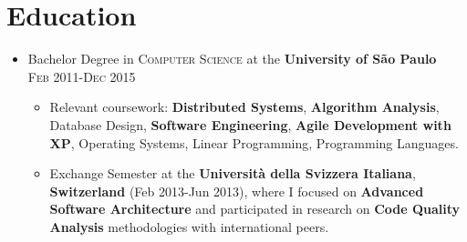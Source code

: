 
\section{Education}
\begin{itemize}
    \item \footnotesize{Bachelor Degree in \textsc{Computer Science} at the \textbf{University of São Paulo}}\\
    \textsc{\scriptsize{Feb 2011-Dec 2015}}
    \begin{itemize}
        \item \scriptsize{Relevant coursework: \textbf{Distributed Systems}, \textbf{Algorithm Analysis}, Database Design, \textbf{Software Engineering}, \textbf{Agile Development with XP}, Operating Systems, Linear Programming, Programming Languages.}
        \item \scriptsize{Exchange Semester at the \textbf{Università della Svizzera Italiana}, \textbf{Switzerland} (Feb 2013-Jun 2013), where I focused on \textbf{Advanced Software Architecture} and participated in research on \textbf{Code Quality Analysis} methodologies with international peers.}
    \end{itemize}
\end{itemize}